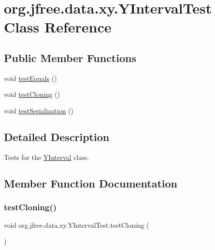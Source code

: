 \hypertarget{classorg_1_1jfree_1_1data_1_1xy_1_1_y_interval_test}{}\section{org.\+jfree.\+data.\+xy.\+Y\+Interval\+Test Class Reference}
\label{classorg_1_1jfree_1_1data_1_1xy_1_1_y_interval_test}
\subsection*{Public Member Functions}
\begin{DoxyCompactItemize}
\item 
void \mbox{\hyperlink{classorg_1_1jfree_1_1data_1_1xy_1_1_y_interval_test_a8a1198c88bec21a6758a210137424ac5}{test\+Equals}} ()
\item 
void \mbox{\hyperlink{classorg_1_1jfree_1_1data_1_1xy_1_1_y_interval_test_a89ffaaeedf28c151ea064174950347a4}{test\+Cloning}} ()
\item 
void \mbox{\hyperlink{classorg_1_1jfree_1_1data_1_1xy_1_1_y_interval_test_a86ce63ab3b15486cbd9eff7ee7436f77}{test\+Serialization}} ()
\end{DoxyCompactItemize}


\subsection{Detailed Description}
Tests for the \mbox{\hyperlink{classorg_1_1jfree_1_1data_1_1xy_1_1_y_interval}{Y\+Interval}} class. 

\subsection{Member Function Documentation}
\mbox{\label{classorg_1_1jfree_1_1data_1_1xy_1_1_y_interval_test_a89ffaaeedf28c151ea064174950347a4}} 
\subsubsection{\texorpdfstring{test\+Cloning()}{testCloning()}}
{\footnotesize\ttfamily void org.\+jfree.\+data.\+xy.\+Y\+Interval\+Test.\+test\+Cloning (\begin{DoxyParamCaption}{ }\end{DoxyParamCaption})}

